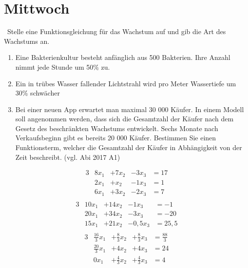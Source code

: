 \clearpage
\section{Mittwoch}\
Stelle eine Funktionsgleichung für das Wachstum auf und gib die Art des Wachstums an.
\begin{enumerate}
	\item Eine Bakterienkultur besteht anfänglich aus 500 Bakterien. Ihre Anzahl nimmt jede Stunde um 50\% zu.
	\item Ein in trübes Wasser fallender Lichtstrahl wird pro Meter Wassertiefe um 30\% schwächer
	\item Bei einer neuen App erwartet man maximal 30 000 Käufer.
	In einem Modell soll angenommen werden, dass sich die Gesamtzahl der Käufer nach dem Gesetz des beschränkten Wachstums entwickelt.
	Sechs Monate nach Verkaufsbeginn gibt es bereits 20 000 Käufer.
	Bestimmen Sie einen Funktionsterm, welcher die Gesamtzahl der Käufer in Abhängigkeit von der Zeit beschreibt. (vgl. Abi 2017 A1)
\end{enumerate}


\begin{alignat*}{3}
	&8x_1 &+7x_2 &-3x_3 &= 17\\
	&2x_1 &+x_2 &-1x_3 &= 1\\
	&6x_1 &+3x_2 &-2x_3 &= 7\\
\end{alignat*}
\begin{alignat*}{3}
	&10x_1 &+14x_2 &-1x_3 &= -1\\
	&20x_1 &+34x_2 &-3x_3 &= -20\\
	&15x_1 &+21x_2 &-0,5x_3 &= 25,5\\
\end{alignat*}
\begin{alignat*}{3}
	&\frac{16}{3}x_1 &+\frac{8}{3}x_2 &+\frac{8}{3}x_3 &= \frac{88}{3}\\
	&\frac{20}{3}x_1 &+4x_2 &+4x_3 &= 24\\
	&0x_1 &+\frac{4}{3}x_2 &+\frac{4}{3}x_3 &= 4\\
\end{alignat*}




